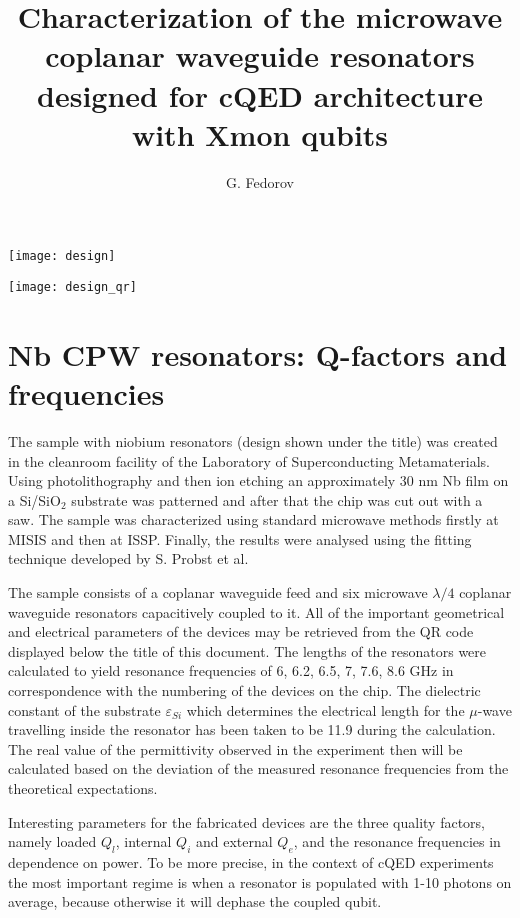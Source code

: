 \documentclass[12pt]{article}
\title{Characterization of the microwave coplanar waveguide resonators designed for cQED architecture with Xmon qubits}
\author{G. Fedorov}
\numberwithin{equation}{section}
\begin{document}
\maketitle

\begin{center}
\texttt{[image: design]}

\texttt{[image: design\_qr]}
\end{center}

\tableofcontents
\newpage

\section{Nb CPW resonators: Q-factors and frequencies}

The sample with niobium resonators (design shown under the title) was created in the cleanroom facility of the Laboratory of Superconducting Metamaterials. Using photolithography and then ion etching an approximately 30 nm Nb film on a Si/SiO$_2$ substrate was patterned and after that the chip was cut out with a saw. The sample was characterized using standard microwave methods firstly at MISIS and then at ISSP. Finally, the results were analysed using the fitting technique developed\cite{probst2015} by S. Probst et al.

The sample consists of a coplanar waveguide feed and six microwave $\lambda/4$ coplanar waveguide resonators capacitively coupled to it. All of the important geometrical and electrical parameters of the devices may be retrieved from the QR code displayed below the title of this document. The lengths of the resonators were calculated to yield resonance frequencies of 6, 6.2, 6.5, 7, 7.6, 8.6 GHz in correspondence with the numbering of the devices on the chip. The dielectric constant of the substrate $\varepsilon_{Si}$ which determines the electrical length for the $\mu$-wave travelling inside the resonator has been taken to be 11.9 during the calculation. The real value of the permittivity observed in the experiment then will be calculated based on the deviation of the measured resonance frequencies from the theoretical expectations.

Interesting parameters for the fabricated devices are the three quality factors, namely loaded $Q_l$, internal $Q_i$ and external $Q_e$, and the resonance frequencies in dependence on power. To be more precise, in the context of cQED experiments the most important regime is when a resonator is populated with 1-10 photons on average, because otherwise it will dephase the coupled qubit. 
\end{document}

